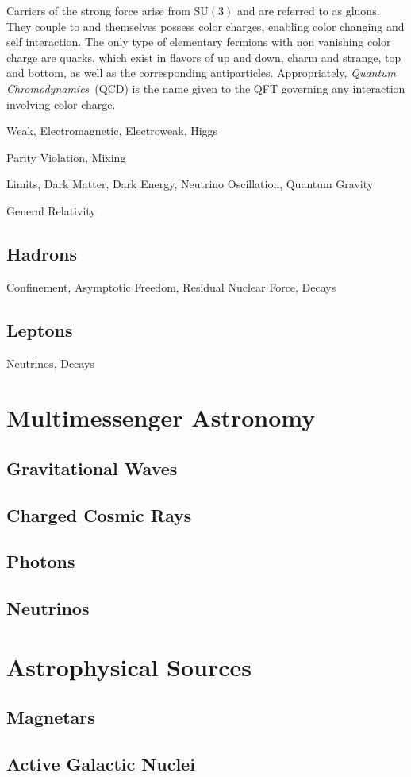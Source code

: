 Carriers of the strong force arise from $\text{SU}(3)$ and are referred to as gluons. They couple to and themselves possess color
charges, enabling color changing and self interaction. The only type of elementary fermions with non vanishing color charge are quarks,
which exist in flavors of up and down, charm and strange, top and bottom, as well as the corresponding antiparticles. Appropriately,
\emph{Quantum Chromodynamics}~(QCD) is the name given to the QFT governing any interaction involving color charge.

\newpage

Weak, Electromagnetic, Electroweak, Higgs

Parity Violation, Mixing

Limits, Dark Matter, Dark Energy, Neutrino Oscillation, Quantum Gravity

General Relativity

\subsection*{Hadrons}
\label{sub:hadrons}

Confinement, Asymptotic Freedom, Residual Nuclear Force, Decays

\subsection*{Leptons}
\label{sub:leptons}

Neutrinos, Decays

\section{Multimessenger Astronomy}
\label{sec:multimessenger}

\subsection*{Gravitational Waves}
\label{sub:gravitational}

\subsection*{Charged Cosmic Rays}
\label{sub:rays}

\subsection*{Photons}
\label{sub:photons}

\subsection*{Neutrinos}
\label{sub:neutrinos}

\section{Astrophysical Sources}
\label{sec:sources}

\subsection*{Magnetars}
\label{sub:magnetars}

\subsection*{Active Galactic Nuclei}
\label{sub:nuclei}
